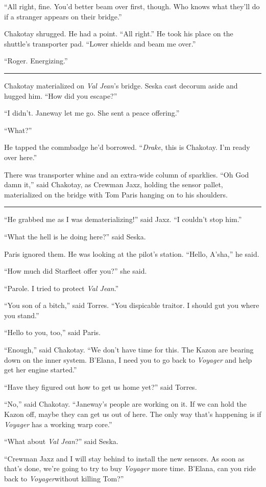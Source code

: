 \documentclass[twoside,letterpaper,12pt]{memoir}
\begin{document}
``All right, fine. You'd better beam over first, though. Who knows what they'll do if a stranger appears on their bridge.''

Chakotay shrugged. He had a point. ``All right.'' He took his place on the shuttle's transporter pad. ``Lower shields and beam me over.''

``Roger. Energizing.''

\fancybreak{\rule{3cm}{0.4 pt}}
Chakotay materialized on \textit{Val Jean}'s bridge. Seska cast decorum aside and hugged him. ``How did you escape?''

``I didn't. Janeway let me go. She sent a peace offering.''

``What?''

He tapped the commbadge he'd borrowed. ``\textit{Drake}, this is Chakotay. I'm ready over here.''

There was transporter whine and an extra-wide column of sparklies. ``Oh God damn it,'' said Chakotay, as Crewman Jaxz, holding the sensor pallet, materialized on the bridge with Tom Paris hanging on to his shoulders.

\fancybreak{\rule{3cm}{0.4 pt}}
``He grabbed me as I was dematerializing!'' said Jaxz. ``I couldn't stop him.''

``What the hell is he doing here?'' said Seska.

Paris ignored them. He was looking at the pilot’s station. ``Hello, A'sha,'' he said.

``How much did Starfleet offer you?'' she said.

``Parole. I tried to protect \textit{Val Jean}.''

``You son of a bitch,'' said Torres. ``You dispicable traitor. I should gut you where you stand.''

``Hello to you, too,'' said Paris.

``Enough,'' said Chakotay. ``We don't have time for this. The Kazon are bearing down on the inner system. B'Elana, I need you to go back to \textit{Voyager} and help get her engine started.''

``Have they figured out how to get us home yet?'' said Torres.

``No,'' said Chakotay. ``Janeway's people are working on it. If we can hold the Kazon off, maybe they can get us out of here. The only way that's happening is if \textit{Voyager} has a working warp core.''

``What about \textit{Val Jean}?'' said Seska.

``Crewman Jaxz and I will stay behind to install the new sensors. As soon as that's done, we're going to try to buy \textit{Voyager} more time. B'Elana, can you ride back to \textit{Voyager}without killing Tom?''
\end{document}
